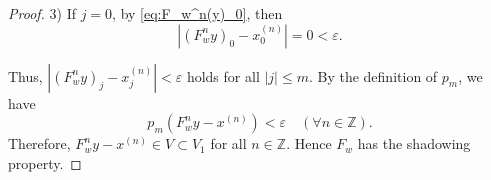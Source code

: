 \documentclass[10pt,a4paper]{amsart}
\begin{document}
\begin{proof}
3) If \(j=0\), by \eqref{eq:F_w^n(y)_0}, then
\[
|(F_w^n y)_0-x^{(n)}_0|=0<\varepsilon.
\]

Thus, $|(F_w^n y)_j-x^{(n)}_j|<\varepsilon$ holds for all \(|j|\le m\).
By the definition of \(p_m\), we have
\[
p_m(F_w^n y-x^{(n)})<\varepsilon
\quad(\forall n\in\mathbb{Z}).
\]
Therefore, \(F_w^n y-x^{(n)}\in V\subset V_1\) for all \(n\in\mathbb{Z}\).
Hence \(F_w\) has the shadowing property.
\end{proof}
\end{document}
